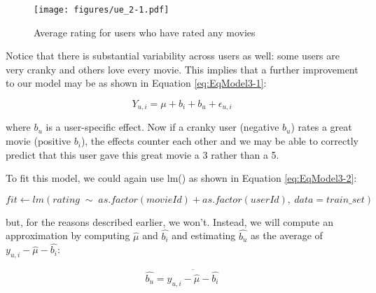 \documentclass[
]{article}
\begin{document}
\begin{figure}
\centering
\texttt{[image: figures/ue\_2-1.pdf]}
\caption{Average rating for users who have rated any
movies\label{fig:average_ratings_for_users_who_have_rated_any_movies}}
\end{figure}

Notice that there is substantial variability across users as well: some
users are very cranky and others love every movie. This implies that a
further improvement to our model may be as shown in Equation
\ref{eq:EqModel3-1}:

%
\par

\label{eq:EqModel3-1} \begin{equation}
  Y_{u,i} = \mu + b_{i} + b_{u} + \epsilon_{u,i}
\end{equation}

where \(b_{u}\) is a user-specific effect. Now if a cranky user
(negative \(b_{u}\)) rates a great movie (positive \(b_{i}\)), the
effects counter each other and we may be able to correctly predict that
this user gave this great movie a 3 rather than a 5.

To fit this model, we could again use lm() as shown in Equation
\ref{eq:EqModel3-2}:

%
\par

\label{eq:EqModel3-2} \begin{equation}
  fit \leftarrow lm(rating \; \sim \; as.factor(movieId) + as.factor(userId), \: data = train\_{}set)
\end{equation}

but, for the reasons described earlier, we won't. Instead, we will
compute an approximation by computing \(\hat{\mu}\) and \(\hat{b_{i}}\)
and estimating \(\hat{b_{u}}\) as the average of
\(y_{u,i}-\hat{\mu}-\hat{b_{i}}\):

%
\par

\label{eq:EqModel3-3} \begin{equation}
  \hat{b_{u}} = \overline{y_{u,i} - \hat{\mu} - \hat{b_{i}}}
\end{equation}
\end{document}
